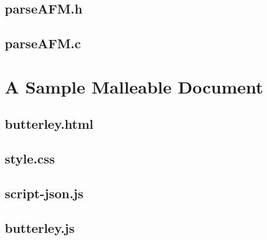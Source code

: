\subsection{parseAFM.h}


\newpage

\subsection{parseAFM.c}


\newpage

\section{A Sample Malleable Document}
\subsection{butterley.html}


\subsection{style.css}

\newpage

\subsection{script-json.js}


\newpage

\subsection{butterley.js}

